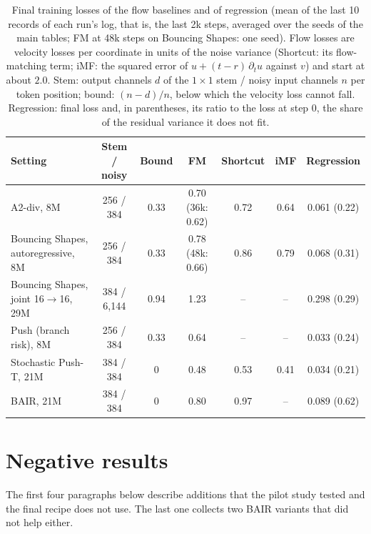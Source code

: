 \begin{table}[h]
\caption{Final training losses of the flow baselines and of regression (mean of the last 10 records of each run's log, that is, the last 2k steps, averaged over the seeds of the main tables; FM at 48k steps on Bouncing Shapes: one seed). Flow losses are velocity losses per coordinate in units of the noise variance (Shortcut: its flow-matching term; iMF: the squared error of $u + (t - r)\,\partial_t u$ against $v$) and start at about $2.0$. Stem: output channels $d$ of the $1\times1$ stem / noisy input channels $n$ per token position; bound: $(n - d)/n$, below which the velocity loss cannot fall. Regression: final loss and, in parentheses, its ratio to the loss at step 0, the share of the residual variance it does not fit.}
\label{tab:flowloss}
\begin{center}
\small
\setlength{\tabcolsep}{4pt}
\begin{tabular}{lcccccc}
\toprule
Setting & Stem / noisy & Bound & FM & Shortcut & iMF & Regression \\
\midrule
A2-div, 8M & 256 / 384 & 0.33 & 0.70 (36k: 0.62) & 0.72 & 0.64 & 0.061 (0.22) \\
Bouncing Shapes, autoregressive, 8M & 256 / 384 & 0.33 & 0.78 (48k: 0.66) & 0.86 & 0.79 & 0.068 (0.31) \\
Bouncing Shapes, joint 16$\to$16, 29M & 384 / 6{,}144 & 0.94 & 1.23 & -- & -- & 0.298 (0.29) \\
Push (branch risk), 8M & 256 / 384 & 0.33 & 0.64 & -- & -- & 0.033 (0.24) \\
Stochastic Push-T, 21M & 384 / 384 & 0 & 0.48 & 0.53 & 0.41 & 0.034 (0.21) \\
BAIR, 21M & 384 / 384 & 0 & 0.80 & 0.97 & -- & 0.089 (0.62) \\
\bottomrule
\end{tabular}
\end{center}
\end{table}

\FloatBarrier
\section{Negative results}
\label{app:negative}
The first four paragraphs below describe additions that the pilot study tested and the final recipe does not use. The last one collects two BAIR variants that did not help either.

